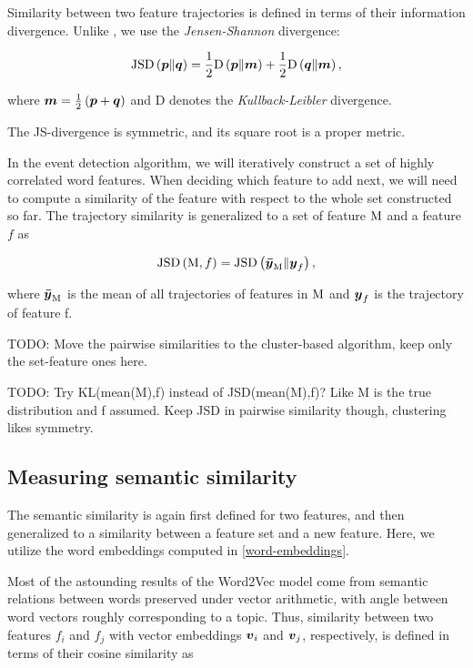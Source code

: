 Similarity between two feature trajectories is defined in terms of their information divergence. Unlike \cite{event-detection}, we use the \textit{Jensen-Shannon} divergence:

\begin{equation*}
	\featsim \left( \vect{p} \| \vect{q} \right) = \frac{1}{2} \text{D} \left( \vect{p} \| \vect{m} \right) + \frac{1}{2} \text{D} \left( \vect{q} \| \vect{m} \right),
\end{equation*}

where $\vect{m} = \frac{1}{2} \left( \vect{p} + \vect{q} \right)$ and D denotes the \textit{Kullback-Leibler} divergence.

The JS-divergence is symmetric, and its square root is a proper metric.

In the event detection algorithm, we will iteratively construct a set of highly correlated word features. When deciding which feature to add next, we will need to compute a similarity of the feature with respect to the whole set constructed so far. The trajectory similarity is generalized to a set of feature $\text{M}$ and a feature $f$ as

\begin{equation}
	\featsim \left( \featset, f \right) = \featsim \left( \vect{\bar{\traj}}_{\featset} \| \vect{\traj}_{f} \right),
\end{equation}

where $\vect{\bar{\traj}}_{\featset}$ is the mean of all trajectories of features in $\text{M}$ and $\vect{\traj}_{f}$ is the trajectory of feature f.

{\color{red} TODO: Move the pairwise similarities to the cluster-based algorithm, keep only the set-feature ones here.}

{\color{blue} TODO: Try KL(mean(M),f) instead of JSD(mean(M),f)? Like M is the true distribution and f assumed. Keep JSD in pairwise similarity though, clustering likes symmetry.}


\subsection{Measuring semantic similarity}

The semantic similarity is again first defined for two features, and then generalized to a similarity between a feature set and a new feature. Here, we utilize the word embeddings computed in \ref{word-embeddings}.

Most of the astounding results of the Word2Vec model come from semantic relations between words preserved under vector arithmetic, with angle between word vectors roughly corresponding to a topic. Thus, similarity between two features $f_{i}$ and $f_{j}$ with vector embeddings $\embed_{i}$ and $\embed_{j}$, respectively, is defined in terms of their cosine similarity as

